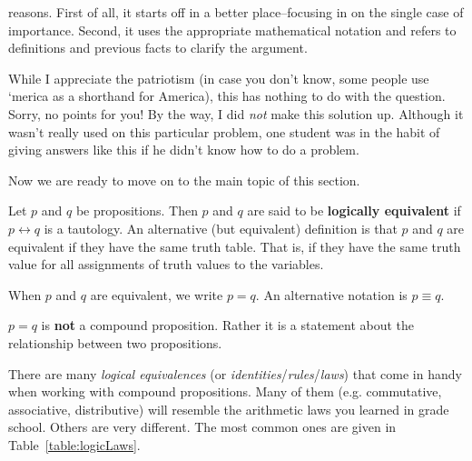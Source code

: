 \begin{eval}
\begin{answer}
\begin{pfevalenum}
reasons.  First of all, it starts off in a better place--focusing in on the single case of importance.  
Second, it uses the appropriate mathematical notation and refers to definitions and previous facts to clarify the argument.
\item
While I appreciate the patriotism (in case you don't know, some people use `merica as a shorthand for America),
this has nothing to do with the question.  Sorry, no points for you!
By the way, I did {\em not} make this solution up.  Although it wasn't really used on this particular problem, 
one student was in the habit of giving answers like this if he didn't know how to do a problem.
\end{pfevalenum} 
\end{answer}
\end{eval}

Now we are ready to move on to the main topic of this section.

\begin{df}
Let $p$ and $q$ be propositions.  Then $p$ and $q$ are said to be {\bf logically equivalent}
if $p \leftrightarrow q$ is a tautology.
An alternative (but equivalent) definition is that 
$p$ and $q$ are equivalent if they have the same truth table.  That is,
if they have the same truth value for all assignments of truth values to the variables. 

When $p$ and $q$ are equivalent, we write \boldmath$p=q$.  
An alternative notation is \boldmath$p \equiv q$.
\end{df}

\begin{rem}
$p=q$ is {\bf not} a compound proposition. Rather it is a statement about the relationship between
two propositions.
\end{rem}


There are many {\em logical equivalences} (or {\em identities}/{\em rules}/{\em laws}) that come in handy when working with 
compound propositions.  
Many of them (e.g. commutative, associative, distributive)
will resemble the arithmetic laws you learned in grade school.  Others are very different.
The most common ones are given in Table~\ref{table:logicLaws}.

